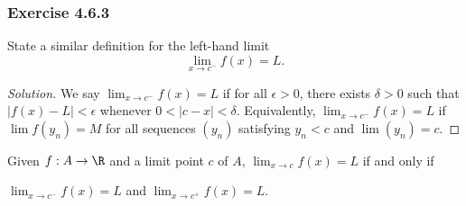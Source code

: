 \subsubsection{Exercise 4.6.3} State a similar definition for the left-hand limit
\[  \lim_{ x \to c^{-} } f(x) = L. \]
\begin{proof}[Solution]
    We say \( \lim_{ x \to c^{-}  } f(x) = L  \) if for all \( \epsilon > 0  \), there exists \( \delta > 0  \) such that \( | f(x) - L  | < \epsilon  \) whenever \( 0 < | c - x  | < \delta  \). Equivalently, \( \lim_{ x \to c^{-} } f(x) = L  \) if \( \lim f(y_n) = M  \) for all sequences \( (y_n)  \) satisfying \( y_n < c  \) and \( \lim (y_n) = c  \).
\end{proof}

\begin{tcolorbox}
\begin{thm}
Given \( f: A \to \R  \) and a limit point \( c  \) of \( A  \), \( \lim_{ x \to c  } f(x) = L  \) if and only if 
\begin{center}
    \( \lim_{ x \to c^{-} } f(x) = L  \) and \( \lim_{ x \to c^{+} } f(x) = L  \).
\end{center}
\end{thm}
\end{tcolorbox}

